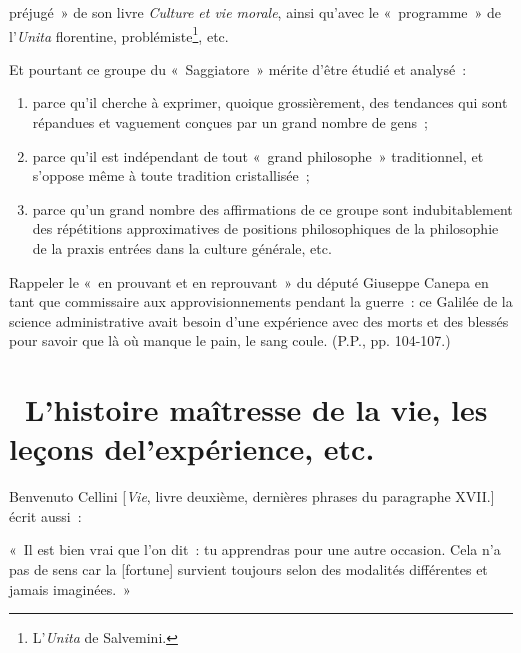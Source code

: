 \documentclass[french,twoside]{book} %
\newenvironment{quoteblock}%
  {\begin{quoting}}
  {\end{quoting}}
\newenvironment{quotebar}{%
    \def\FrameCommand{{\color{rubric!10!}\vrule width 0.5em} \hspace{0.9em}}%
    \def\OuterFrameSep{\itemsep} %
    \MakeFramed {\advance\hsize-\width \FrameRestore}
  }%
  {%
    \endMakeFramed
  }
\renewenvironment{quoteblock}%
  {%
    \savenotes
    \setstretch{0.9}
    \normalfont
    \begin{quotebar}
  }
  {%
    \end{quotebar}
    \spewnotes
  }
\begin{document}
préjugé » de son livre \emph{Culture et vie morale}, ainsi qu’avec le « programme » de l’\emph{Unita} florentine, problémiste\footnote{L'\emph{Unita} de Salvemini.}, etc.\par
Et pourtant ce groupe du « Saggiatore » mérite d’être étudié et analysé :\par

\begin{enumerate}[itemsep=0pt,]
\item parce qu’il cherche à exprimer, quoique grossièrement, des tendances qui sont répandues et vaguement conçues par un grand nombre de gens ; 
\item parce qu’il est indépendant de tout « grand philosophe » traditionnel, et s’oppose même à toute tradition cristallisée ; 
\item parce qu’un grand nombre des affirmations de ce groupe sont indubitablement des répétitions approximatives de positions philosophiques de la philosophie de la praxis entrées dans la culture générale, etc.
\end{enumerate}

\noindent Rappeler le « en prouvant et en reprouvant » du député Giuseppe Canepa en tant que commissaire aux approvisionnements pendant la guerre : ce Galilée de la science administrative avait besoin d’une expérience avec des morts et des blessés pour savoir que là où manque le pain, le sang coule. (P.P., pp. 104-107.)\par
{\raggedleft \noindent [1933]}
\section[{ L'histoire maîtresse de la vie, les leçons del’expérience, etc.}]{ L'histoire maîtresse de la vie, les leçons del’expérience, etc.}
\noindent Benvenuto Cellini [\emph{Vie}, livre deuxième, dernières phrases du paragraphe XVII.] écrit aussi :\par

\begin{quoteblock}
 \noindent « Il est bien vrai que l’on dit : tu apprendras pour une autre occasion. Cela n’a pas de sens car la [fortune] survient toujours selon des modalités différentes et jamais imaginées. »
\end{quoteblock}
\end{document}
